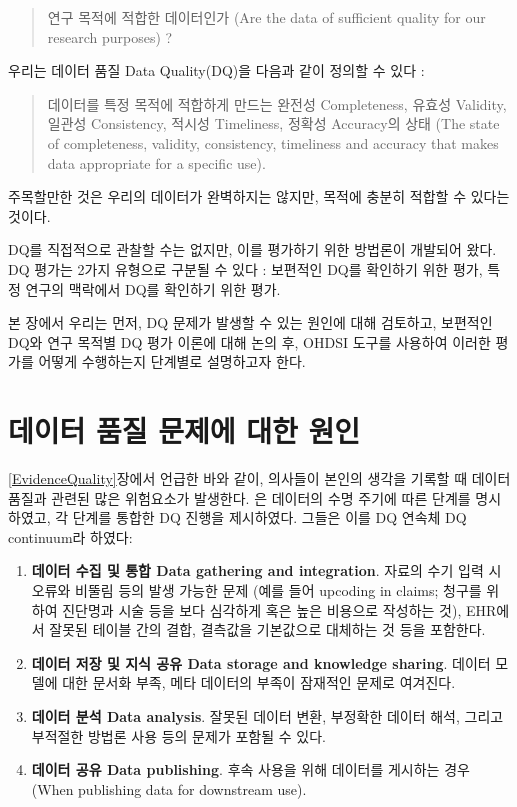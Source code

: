 \documentclass[10.5pt]{book}
\providecommand{\tightlist}{%
  \setlength{\itemsep}{0pt}\setlength{\parskip}{0pt}}
\theoremstyle{definition}
\theoremstyle{definition}
\theoremstyle{definition}
\theoremstyle{remark}
\begin{document}
\begin{quote}
연구 목적에 적합한 데이터인가 (Are the data of sufficient quality for
our research purposes) ?
\end{quote}

우리는 데이터 품질 Data Quality(DQ)을 다음과 같이 정의할 수 있다
\citep{roebuck_2012}: 

\begin{quote}
데이터를 특정 목적에 적합하게 만드는 완전성 Completeness, 유효성
Validity, 일관성 Consistency, 적시성 Timeliness, 정확성 Accuracy의 상태
(The state of completeness, validity, consistency, timeliness and
accuracy that makes data appropriate for a specific use).
\end{quote}

주목할만한 것은 우리의 데이터가 완벽하지는 않지만, 목적에 충분히 적합할
수 있다는 것이다.

DQ를 직접적으로 관찰할 수는 없지만, 이를 평가하기 위한 방법론이 개발되어
왔다. DQ 평가는 2가지 유형으로 구분될 수 있다 \citep{weiskopf_2013}:
보편적인 DQ를 확인하기 위한 평가, 특정 연구의 맥락에서 DQ를 확인하기
위한 평가.

본 장에서 우리는 먼저, DQ 문제가 발생할 수 있는 원인에 대해 검토하고,
보편적인 DQ와 연구 목적별 DQ 평가 이론에 대해 논의 후, OHDSI 도구를
사용하여 이러한 평가를 어떻게 수행하는지 단계별로 설명하고자 한다.

\section{데이터 품질 문제에 대한 원인}\label{----}

\ref{EvidenceQuality}장에서 언급한 바와 같이, 의사들이 본인의 생각을
기록할 때 데이터 품질과 관련된 많은 위험요소가 발생한다.
\citet{dasu_2003} 은 데이터의 수명 주기에 따른 단계를 명시하였고, 각
단계를 통합한 DQ 진행을 제시하였다. 그들은 이를 DQ 연속체 DQ continuum라
하였다:

\begin{enumerate}
\def\labelenumi{\arabic{enumi}.}
\tightlist
\item
  \textbf{데이터 수집 및 통합 Data gathering and integration}. 자료의
  수기 입력 시 오류와 비뚤림 등의 발생 가능한 문제 (예를 들어 upcoding
  in claims; 청구를 위하여 진단명과 시술 등을 보다 심각하게 혹은 높은
  비용으로 작성하는 것), EHR에서 잘못된 테이블 간의 결합, 결측값을
  기본값으로 대체하는 것 등을 포함한다.
\item
  \textbf{데이터 저장 및 지식 공유 Data storage and knowledge sharing}.
  데이터 모델에 대한 문서화 부족, 메타 데이터의 부족이 잠재적인 문제로
  여겨진다.
\item
  \textbf{데이터 분석 Data analysis}. 잘못된 데이터 변환, 부정확한
  데이터 해석, 그리고 부적절한 방법론 사용 등의 문제가 포함될 수 있다.
\item
  \textbf{데이터 공유 Data publishing}. 후속 사용을 위해 데이터를
  게시하는 경우 (When publishing data for downstream use).
\end{enumerate}
\end{document}
